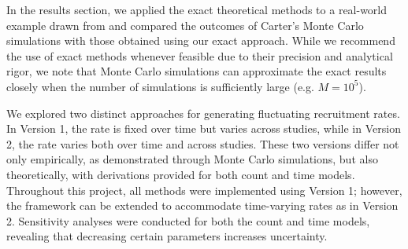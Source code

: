 In the results section, we applied the exact theoretical methods to a real-world example drawn from \cite{carter2004application} and compared the outcomes of Carter's Monte Carlo simulations with those obtained using our exact approach. While we recommend the use of exact methods whenever feasible due to their precision and analytical rigor, we note that Monte Carlo simulations can approximate the exact results closely when the number of simulations is sufficiently large (e.g. $M=10^5$).

We explored two distinct approaches for generating fluctuating recruitment rates. In Version 1, the rate is fixed over time but varies across studies, while in Version 2, the rate varies both over time and across studies. These two versions differ not only empirically, as demonstrated through Monte Carlo simulations, but also theoretically, with derivations provided for both count and time models. Throughout this project, all methods were implemented using Version 1; however, the framework can be extended to accommodate time-varying rates as in Version 2. Sensitivity analyses were conducted for both the count and time models, revealing that decreasing certain parameters increases uncertainty.

